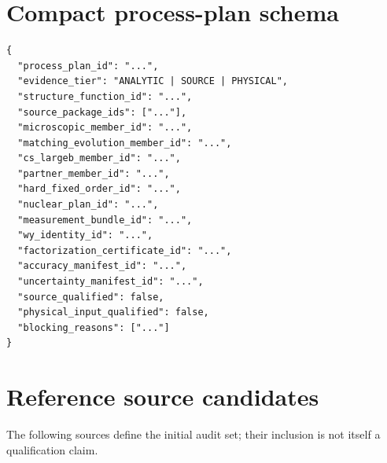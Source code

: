 \documentclass[11pt]{article}
\begin{document}
\section{Compact process-plan schema}
\label{app:process-schema}

\begin{verbatim}
{
  "process_plan_id": "...",
  "evidence_tier": "ANALYTIC | SOURCE | PHYSICAL",
  "structure_function_id": "...",
  "source_package_ids": ["..."],
  "microscopic_member_id": "...",
  "matching_evolution_member_id": "...",
  "cs_largeb_member_id": "...",
  "partner_member_id": "...",
  "hard_fixed_order_id": "...",
  "nuclear_plan_id": "...",
  "measurement_bundle_id": "...",
  "wy_identity_id": "...",
  "factorization_certificate_id": "...",
  "accuracy_manifest_id": "...",
  "uncertainty_manifest_id": "...",
  "source_qualified": false,
  "physical_input_qualified": false,
  "blocking_reasons": ["..."]
}
\end{verbatim}

\section{Reference source candidates}
\label{app:sources}

The following sources define the initial audit set; their inclusion is not itself a qualification claim.
\end{document}
